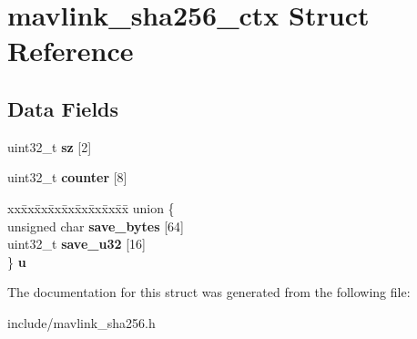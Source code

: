 \hypertarget{structmavlink__sha256__ctx}{}\section{mavlink\+\_\+sha256\+\_\+ctx Struct Reference}
\label{structmavlink__sha256__ctx}
\subsection*{Data Fields}
\begin{DoxyCompactItemize}
\item 
uint32\+\_\+t {\bfseries sz} \mbox{[}2\mbox{]}\hypertarget{structmavlink__sha256__ctx_ae3f44ea89d5e7ba8a55d79201b3be1f7}{}\label{structmavlink__sha256__ctx_ae3f44ea89d5e7ba8a55d79201b3be1f7}

\item 
uint32\+\_\+t {\bfseries counter} \mbox{[}8\mbox{]}\hypertarget{structmavlink__sha256__ctx_aa11171ae25132b58f410834ee39aa92f}{}\label{structmavlink__sha256__ctx_aa11171ae25132b58f410834ee39aa92f}

\item 
\begin{tabbing}
xx\=xx\=xx\=xx\=xx\=xx\=xx\=xx\=xx\=\kill
union \{\\
\>unsigned char {\bfseries save\_bytes} \mbox{[}64\mbox{]}\\
\>uint32\_t {\bfseries save\_u32} \mbox{[}16\mbox{]}\\
\} {\bfseries u}\hypertarget{structmavlink__sha256__ctx_a29d2b8ea23edf0fd95f810b077ea3195}{}\label{structmavlink__sha256__ctx_a29d2b8ea23edf0fd95f810b077ea3195}
\\

\end{tabbing}\end{DoxyCompactItemize}


The documentation for this struct was generated from the following file\+:\begin{DoxyCompactItemize}
\item 
include/mavlink\+\_\+sha256.\+h\end{DoxyCompactItemize}
